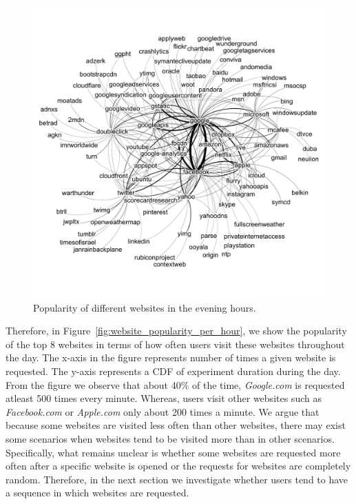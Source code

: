 \documentclass[letterpaper,twocolumn]{article}
\begin{document}
 \begin{figure}[t]
\centering
 \vspace{-45pt}
\includegraphics[width=\linewidth]{img/EveningLength2Cluster}
\vspace{-55pt}
\caption{Popularity of different websites in the evening hours.}
 \label{fig:evening}
\endminipage
    \vspace{-15pt}
 \end{figure}

Therefore, in Figure~\ref{fig:website_popularity_per_hour}, we show the popularity of the top 8 websites in terms of how often users visit these websites throughout the day.
The x-axis in the figure represents number of times a given website is requested.
The y-axis represents a CDF of experiment duration during the day.
From the figure we observe that about 40\% of the time, \textit{Google.com} is requested atleast 500 times every minute.
Whereas, users visit other websites such as \textit{Facebook.com} or \textit{Apple.com} only about 200 times a minute. 
We argue that because some websites are visited less often than other websites, there may exist some scenarios when websites tend to be visited more than in other scenarios.
Specifically, what remains unclear is whether some websites are requested more often after a specific website is opened or the requests for websites are completely random.
Therefore, in the next section we investigate whether users tend to have a sequence in which websites are requested.
\end{document}
